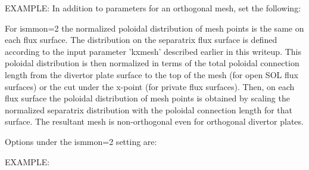 \documentclass [12pt]{article}
\def\hsa{\hskip.4truein}
\begin{document}
EXAMPLE:
In addition to parameters for an orthogonal mesh, set the following:
{\sf
{}
}
For ismmon=2 the normalized poloidal distribution of mesh points is
the same on each flux surface.  The distribution on the separatrix
flux surface is defined according to the input parameter 'kxmesh'
described earlier in this writeup.  This poloidal distribution is then
normalized in terms of the total poloidal connection length from the
divertor plate surface to the top of the mesh (for open SOL flux
surfaces) or the cut under the x-point (for private flux surfaces).
Then, on each flux surface the poloidal distribution of mesh points is
obtained by scaling the normalized separatrix distribution with the
poloidal connection length for that surface.  The resultant mesh is
non-orthogonal even for orthogonal divertor plates.  

Options under the ismmon=2 setting are:
{\sf
{}
}
EXAMPLE:
\end{document}
